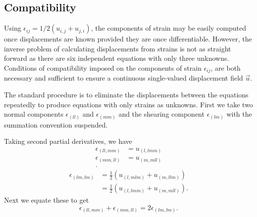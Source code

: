 
\subsection{Compatibility}
Using $\epsilon_{ij} = 1 / 2 \left( u_{i,j} + u_{j,i} \right)$, the components of strain may be easily computed once displacements are known provided they are once differentiable.
However, the inverse problem of calculating displacements from strains is not as straight forward as there are six independent equations with only three unknowns.
Conditions of compatibility imposed on the components of strain $\epsilon_{ij}$, are both necessary and sufficient to ensure a continuous single-valued displacement field $\Vec{u}$.

The standard procedure is to eliminate the displacements between the equations repeatedly to produce equations with only strains as unknowns.
First we take two normal components $\epsilon_{( l l)}$ and $\epsilon_{(mm)}$ and the shearing component $\epsilon_{(lm)}$ with the summation convention suspended.

Taking second partial derivatives, we have
\begin{align*}
  \epsilon_{( l l,mm)} &= u_{(l,lmm)} \\
  \epsilon_{(mm, l l)} &= u_{(m,m l l)} \\
.\end{align*}
\begin{align*}
  \epsilon_{(lm,lm)} &= \frac{1}{2} \left( u_{(l,mlm)} + u_{(m,l lm)} \right) \\
  &= \frac{1}{2} \left( u_{(l,lmm)} + u_{(m,ml l)} \right)
.\end{align*}
Next we equate these to get
\begin{equation*}
  \epsilon_{(l l,mm)} + \epsilon_{(mm,l l)} = 2\epsilon_{(lm,lm)}
.\end{equation*}

